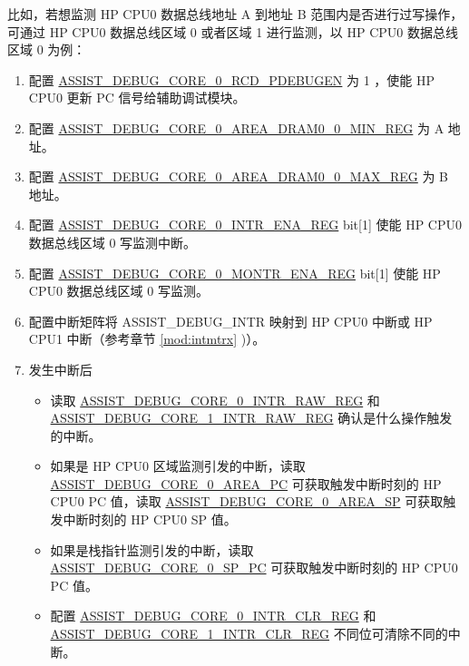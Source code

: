 \documentclass[main\_\_CN.tex]{subfiles}
\begin{document}
 比如，若想监测 HP CPU0 数据总线地址 A 到地址 B 范围内是否进行过写操作，可通过 HP CPU0 数据总线区域 0 或者区域 1 进行监测，以 HP CPU0 数据总线区域 0 为例：
\begin{enumerate}
    \item 配置 \hyperref[fielddesc:ASSISTDEBUGCORE0RCDPDEBUGEN]{ASSIST\_DEBUG\_CORE\_0\_RCD\_PDEBUGEN} 为 1 ，使能 HP CPU0 更新 PC 信号给辅助调试模块。
    \item 配置 \hyperref[regdesc:ASSISTDEBUGCORE0AREADRAM00MINREG]{ASSIST\_DEBUG\_CORE\_0\_AREA\_DRAM0\_0\_MIN\_REG} 为 A 地址。
    \item 配置 \hyperref[regdesc:ASSISTDEBUGCORE0AREADRAM00MAXREG]{ASSIST\_DEBUG\_CORE\_0\_AREA\_DRAM0\_0\_MAX\_REG} 为 B 地址。
    \item 配置 \hyperref[regdesc:ASSISTDEBUGCORE0INTRENAREG]{ASSIST\_DEBUG\_CORE\_0\_INTR\_ENA\_REG} bit[1] 使能 HP CPU0 数据总线区域 0 写监测中断。
    \item 配置 \hyperref[regdesc:ASSISTDEBUGCORE0MONTRENAREG]{ASSIST\_DEBUG\_CORE\_0\_MONTR\_ENA\_REG} bit[1] 使能 HP CPU0 数据总线区域 0 写监测。
    \item 配置中断矩阵将 ASSIST\_DEBUG\_INTR 映射到 HP CPU0 中断或 HP CPU1 中断（参考章节 \ref{mod:intmtrx} \textit{})）。
    \item 发生中断后
    \begin{itemize}
        \item 读取 \hyperref[regdesc:ASSISTDEBUGCORE0INTRRAWREG]{ASSIST\_DEBUG\_CORE\_0\_INTR\_RAW\_REG} 和 \hyperref[regdesc:ASSISTDEBUGCORE1INTRRAWREG]{ASSIST\_DEBUG\_CORE\_1\_INTR\_RAW\_REG} 确认是什么操作触发的中断。
        \item 如果是 HP CPU0 区域监测引发的中断，读取 \hyperref[fielddesc:ASSISTDEBUGCORE0AREAPC]{ASSIST\_DEBUG\_CORE\_0\_AREA\_PC} 可获取触发中断时刻的 HP CPU0 PC 值，读取 \hyperref[fielddesc:ASSISTDEBUGCORE0AREASP]{ASSIST\_DEBUG\_CORE\_0\_AREA\_SP} 可获取触发中断时刻的 HP CPU0 SP 值。
        \item 如果是栈指针监测引发的中断，读取 \hyperref[fielddesc:ASSISTDEBUGCORE0SPPC]{ASSIST\_DEBUG\_CORE\_0\_SP\_PC} 可获取触发中断时刻的 HP CPU0 PC 值。
        \item 配置 \hyperref[regdesc:ASSISTDEBUGCORE0INTRCLRREG]{ASSIST\_DEBUG\_CORE\_0\_INTR\_CLR\_REG} 和 \hyperref[regdesc:ASSISTDEBUGCORE1INTRCLRREG]{ASSIST\_DEBUG\_CORE\_1\_INTR\_CLR\_REG} 不同位可清除不同的中断。
    \end{itemize}

\end{enumerate}
\end{document}
